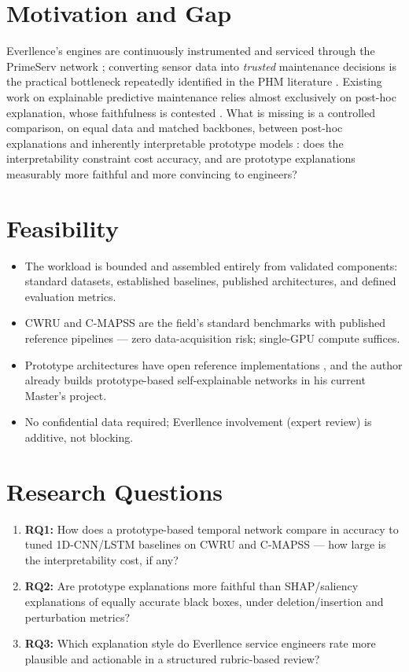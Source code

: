 \documentclass[10pt,a4paper]{article}
\begin{document}
\section{Motivation and Gap}

Everllence's engines are continuously instrumented and serviced through the PrimeServ network \cite{everllence2025}; converting sensor data into \emph{trusted} maintenance decisions is the practical bottleneck repeatedly identified in the PHM literature \cite{fink2020}. Existing work on explainable predictive maintenance relies almost exclusively on post-hoc explanation, whose faithfulness is contested \cite{rudin2019}. What is missing is a controlled comparison, on equal data and matched backbones, between post-hoc explanations and inherently interpretable prototype models \cite{chen2019protopnet}: does the interpretability constraint cost accuracy, and are prototype explanations measurably more faithful and more convincing to engineers?

\section{Feasibility}

\begin{itemize}
    \item The workload is bounded and assembled entirely from validated components: standard datasets, established baselines, published architectures, and defined evaluation metrics.
    \item CWRU and C-MAPSS are the field's standard benchmarks with published reference pipelines \cite{smith2015cwru, saxena2008cmapss} --- zero data-acquisition risk; single-GPU compute suffices.
    \item Prototype architectures have open reference implementations \cite{chen2019protopnet}, and the author already builds prototype-based self-explainable networks in his current Master's project.
    \item No confidential data required; Everllence involvement (expert review) is additive, not blocking.
\end{itemize}

\section{Research Questions}

\begin{enumerate}
    \item \textbf{RQ1:} How does a prototype-based temporal network compare in accuracy to tuned 1D-CNN/LSTM baselines on CWRU and C-MAPSS --- how large is the interpretability cost, if any?
    \item \textbf{RQ2:} Are prototype explanations more faithful than SHAP/saliency explanations of equally accurate black boxes, under deletion/insertion and perturbation metrics?
    \item \textbf{RQ3:} Which explanation style do Everllence service engineers rate more plausible and actionable in a structured rubric-based review?
\end{enumerate}
\end{document}
